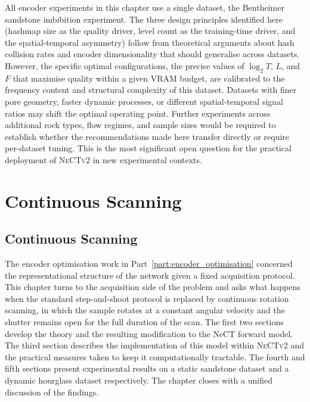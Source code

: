 \documentclass[12pt, a4paper, twoside]{report}
\newcommand{\NeCTv}{\textsc{NeCTv2}}
\begin{document}
All encoder experiments in this chapter use a single dataset, the Bentheimer sandstone imbibition experiment. The three design principles identified here (hashmap size as the quality driver, level count as the training-time driver, and the spatial-temporal asymmetry) follow from theoretical arguments about hash collision rates and encoder dimensionality that should generalise across datasets. However, the specific optimal configurations, the precise values of $\log_2 T$, $L$, and $F$ that maximise quality within a given VRAM budget, are calibrated to the frequency content and structural complexity of this dataset. Datasets with finer pore geometry, faster dynamic processes, or different spatial-temporal signal ratios may shift the optimal operating point. Further experiments across additional rock types, flow regimes, and sample sizes would be required to establish whether the recommendations made here transfer directly or require per-dataset tuning. This is the most significant open question for the practical deployment of \NeCTv{} in new experimental contexts.


\part{Continuous Scanning}
\label{part:continuous_scanning}

\chapter{Continuous Scanning}
\label{chap:continuous}

The encoder optimisation work in Part~\ref{part:encoder_optimisation} concerned the representational structure of the network given a fixed acquisition protocol. This chapter turns to the acquisition side of the problem and asks what happens when the standard step-and-shoot protocol is replaced by continuous rotation scanning, in which the sample rotates at a constant angular velocity and the shutter remains open for the full duration of the scan. The first two sections develop the theory and the resulting modification to the NeCT forward model. The third section describes the implementation of this model within \NeCTv{} and the practical measures taken to keep it computationally tractable. The fourth and fifth sections present experimental results on a static sandstone dataset and a dynamic hourglass dataset respectively. The chapter closes with a unified discussion of the findings.
\end{document}
